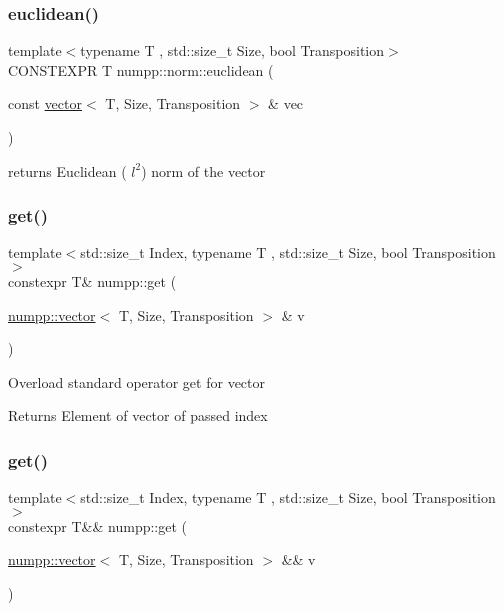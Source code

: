 \subsubsection{\texorpdfstring{euclidean()}{euclidean()}}
{\footnotesize\ttfamily template$<$typename T , std\+::size\+\_\+t Size, bool Transposition$>$ \\
C\+O\+N\+S\+T\+E\+X\+PR T numpp\+::norm\+::euclidean (\begin{DoxyParamCaption}\item[{const \hyperlink{classnumpp_1_1vector}{vector}$<$ T, Size, Transposition $>$ \&}]{vec }\end{DoxyParamCaption})}

returns Euclidean ( $ l^2 $) norm of the vector\mbox{\label{group__numpp__structures__vector_ga01dd4b7887091df5206acba15d280d48}} 
\subsubsection{\texorpdfstring{get()}{get()}\hspace{0.1cm}{\footnotesize\ttfamily [1/4]}}
{\footnotesize\ttfamily template$<$std\+::size\+\_\+t Index, typename T , std\+::size\+\_\+t Size, bool Transposition$>$ \\
constexpr T\& numpp\+::get (\begin{DoxyParamCaption}\item[{\hyperlink{classnumpp_1_1vector}{numpp\+::vector}$<$ T, Size, Transposition $>$ \&}]{v }\end{DoxyParamCaption})}

Overload standard operator get for vector \begin{DoxyReturn}{Returns}
Element of vector of passed index
\end{DoxyReturn}
\mbox{\label{group__numpp__structures__vector_ga9172642419f215f74fbfe6616c8453b2}} 
\subsubsection{\texorpdfstring{get()}{get()}\hspace{0.1cm}{\footnotesize\ttfamily [2/4]}}
{\footnotesize\ttfamily template$<$std\+::size\+\_\+t Index, typename T , std\+::size\+\_\+t Size, bool Transposition$>$ \\
constexpr T\&\& numpp\+::get (\begin{DoxyParamCaption}\item[{\hyperlink{classnumpp_1_1vector}{numpp\+::vector}$<$ T, Size, Transposition $>$ \&\&}]{v }\end{DoxyParamCaption})}

